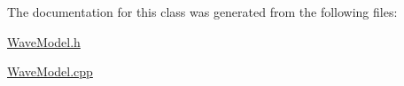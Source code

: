 The documentation for this class was generated from the following files\-:\begin{DoxyCompactItemize}
\item 
\hyperlink{WaveModel_8h}{Wave\-Model.\-h}\item 
\hyperlink{WaveModel_8cpp}{Wave\-Model.\-cpp}\end{DoxyCompactItemize}
